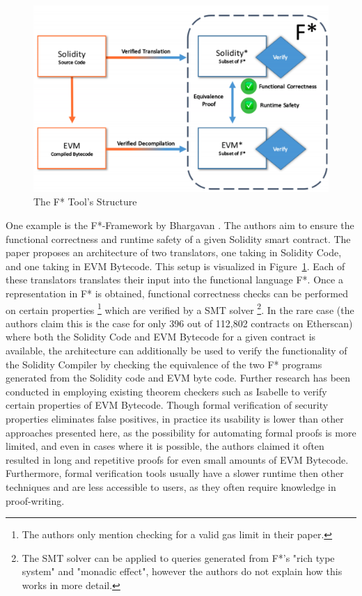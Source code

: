 \documentclass[letterpaper,twocolumn,10pt]{article}
\begin{document}
\begin{figure}
\begin{center}
\includegraphics[scale=0.2]{Fstar}
\end{center}
\caption{\label{fig:fstar} The F* Tool's Structure}
\end{figure}


One example is the F*-Framework by Bhargavan \cite{bhargavan_delignat-lavaud_fournet_gollamudi_gonthier_kobeissi_kulatova_rastogi_sibut-pinote_swamy_etal._2016}. The authors aim to ensure the functional correctness and runtime safety of a given Solidity smart contract. The paper proposes an architecture of two translators, one taking in Solidity Code, and one taking in EVM Bytecode. This setup is visualized in Figure~\ref{fig:fstar}. Each of these translators translates their input into the functional language F*. Once a representation in F* is obtained, functional correctness checks can be performed on certain properties \footnote{The authors only mention checking for a valid gas limit in their paper.} which are verified by a SMT solver \footnote{The SMT solver can be applied to queries generated from F*'s "rich type system" and "monadic effect", however the authors do not explain how this works in more detail.}. In the rare case (the authors claim this is the case for only 396 out of 112,802 contracts on Etherscan) where both the Solidity Code and EVM Bytecode for a given contract is available, the architecture can additionally be used to verify the functionality of the Solidity Compiler by checking the equivalence of the two F* programs generated from the Solidity code and EVM byte code. 
Further research has been conducted in employing existing theorem checkers such as Isabelle\cite{amani_bégel_bortin_staples_2018} to verify certain properties of EVM Bytecode. Though formal verification of security properties eliminates false positives, in practice its usability is lower than other approaches presented here, as the possibility for automating formal proofs is more limited, and even in cases where it is possible, the authors claimed it often resulted in long and repetitive proofs for even small amounts of EVM Bytecode. Furthermore, formal verification tools usually have a slower runtime then other techniques and are less accessible to users, as they often require knowledge in proof-writing.
\end{document}
